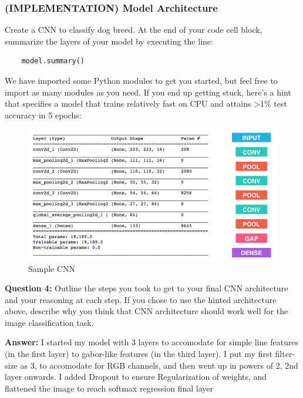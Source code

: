 \documentclass[11pt]{article}
\makeatletter
\def\maxwidth{\ifdim\Gin@nat@width>\linewidth\linewidth
    \else\Gin@nat@width\fi}
\let\Oldincludegraphics\includegraphics
\renewcommand{\includegraphics}[1]{\Oldincludegraphics[width=.8\maxwidth]{#1}}
\makeatother
\begin{document}
    \hypertarget{implementation-model-architecture}{%
\subsubsection{(IMPLEMENTATION) Model
Architecture}\label{implementation-model-architecture}}

Create a CNN to classify dog breed. At the end of your code cell block,
summarize the layers of your model by executing the line:

\begin{verbatim}
    model.summary()
\end{verbatim}

We have imported some Python modules to get you started, but feel free
to import as many modules as you need. If you end up getting stuck,
here's a hint that specifies a model that trains relatively fast on CPU
and attains \textgreater{}1\% test accuracy in 5 epochs:

\begin{figure}
\centering
\includegraphics{images/sample_cnn.png}
\caption{Sample CNN}
\end{figure}

\textbf{Question 4:} Outline the steps you took to get to your final CNN
architecture and your reasoning at each step. If you chose to use the
hinted architecture above, describe why you think that CNN architecture
should work well for the image classification task.

\textbf{Answer:} I started my model with 3 layers to accomodate for
simple line features (in the first layer) to gabor-like features (in the
third layer). I put my first filter-size as 3, to accomodate for RGB
channels, and then went up in powers of 2, 2nd layer onwards. I added
Dropout to ensure Regularization of weights, and flattened the image to
reach softmax regression final layer
\end{document}
